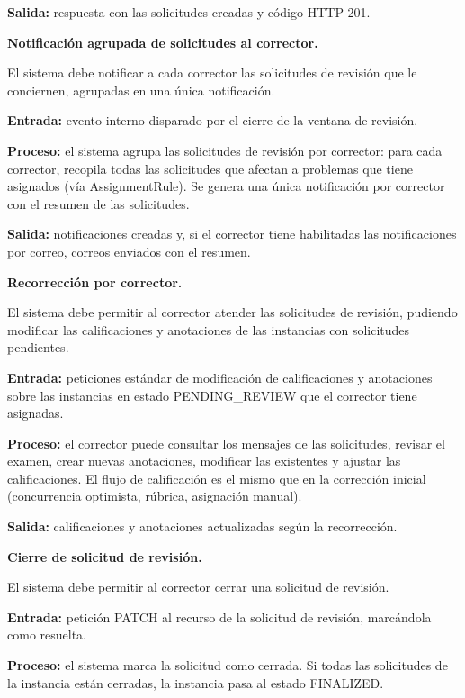 \begin{functional}
\begin{functional}
    \textbf{Salida:} respuesta con las solicitudes creadas y código HTTP 201.

    \item \textbf{Notificación agrupada de solicitudes al corrector.}

    El sistema debe notificar a cada corrector las solicitudes de revisión que le conciernen, agrupadas en una única notificación.

    \textbf{Entrada:} evento interno disparado por el cierre de la ventana de revisión.

    \textbf{Proceso:} el sistema agrupa las solicitudes de revisión por corrector: para cada corrector, recopila todas las solicitudes que afectan a problemas que tiene asignados (vía AssignmentRule). Se genera una única notificación por corrector con el resumen de las solicitudes.

    \textbf{Salida:} notificaciones creadas y, si el corrector tiene habilitadas las notificaciones por correo, correos enviados con el resumen.

    \item \textbf{Recorrección por corrector.}

    El sistema debe permitir al corrector atender las solicitudes de revisión, pudiendo modificar las calificaciones y anotaciones de las instancias con solicitudes pendientes.

    \textbf{Entrada:} peticiones estándar de modificación de calificaciones y anotaciones sobre las instancias en estado PENDING\_REVIEW que el corrector tiene asignadas.

    \textbf{Proceso:} el corrector puede consultar los mensajes de las solicitudes, revisar el examen, crear nuevas anotaciones, modificar las existentes y ajustar las calificaciones. El flujo de calificación es el mismo que en la corrección inicial (concurrencia optimista, rúbrica, asignación manual).

    \textbf{Salida:} calificaciones y anotaciones actualizadas según la recorrección.

    \item \textbf{Cierre de solicitud de revisión.}

    El sistema debe permitir al corrector cerrar una solicitud de revisión.

    \textbf{Entrada:} petición PATCH al recurso de la solicitud de revisión, marcándola como resuelta.

    \textbf{Proceso:} el sistema marca la solicitud como cerrada. Si todas las solicitudes de la instancia están cerradas, la instancia pasa al estado FINALIZED.


\end{functional}
\end{functional}
